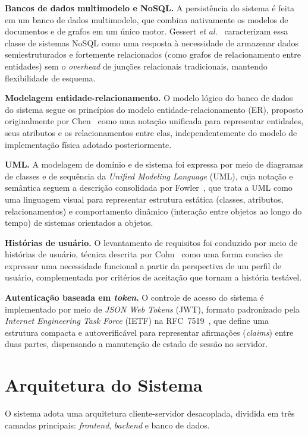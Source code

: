 \documentclass[conference,a4paper]{IEEEtran}
\begin{document}
\textbf{Bancos de dados multimodelo e NoSQL.} A persistência do sistema é feita em um banco de dados multimodelo, que combina nativamente os modelos de documentos e de grafos em um único motor. Gessert \textit{et al.}~\cite{gessert2017} caracterizam essa classe de sistemas NoSQL como uma resposta à necessidade de armazenar dados semiestruturados e fortemente relacionados (como grafos de relacionamento entre entidades) sem o \textit{overhead} de junções relacionais tradicionais, mantendo flexibilidade de esquema.

\textbf{Modelagem entidade-relacionamento.} O modelo lógico do banco de dados do sistema segue os princípios do modelo entidade-relacionamento (ER), proposto originalmente por Chen~\cite{chen1976} como uma notação unificada para representar entidades, seus atributos e os relacionamentos entre elas, independentemente do modelo de implementação física adotado posteriormente.

\textbf{UML.} A modelagem de domínio e de sistema foi expressa por meio de diagramas de classes e de sequência da \textit{Unified Modeling Language} (UML), cuja notação e semântica seguem a descrição consolidada por Fowler~\cite{fowler2004}, que trata a UML como uma linguagem visual para representar estrutura estática (classes, atributos, relacionamentos) e comportamento dinâmico (interação entre objetos ao longo do tempo) de sistemas orientados a objetos.

\textbf{Histórias de usuário.} O levantamento de requisitos foi conduzido por meio de histórias de usuário, técnica descrita por Cohn~\cite{cohn2004} como uma forma concisa de expressar uma necessidade funcional a partir da perspectiva de um perfil de usuário, complementada por critérios de aceitação que tornam a história testável.

\textbf{Autenticação baseada em \textit{token}.} O controle de acesso do sistema é implementado por meio de \textit{JSON Web Tokens} (JWT), formato padronizado pela \textit{Internet Engineering Task Force} (IETF) na RFC~7519~\cite{jones2015}, que define uma estrutura compacta e autoverificável para representar afirmações (\textit{claims}) entre duas partes, dispensando a manutenção de estado de sessão no servidor.

\section{Arquitetura do Sistema}

O sistema adota uma arquitetura cliente-servidor desacoplada, dividida em três camadas principais: \textit{frontend}, \textit{backend} e banco de dados.
\end{document}
